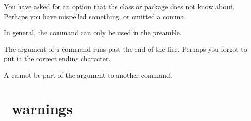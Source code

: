 \begin{plainlist}
\item[]

    You have asked for an option that the class or package does not know about.
Perhaps you have mispelled something, or omitted a comma.


\item[]

    In general, the \cmd{\usepackage} command can only be used in the 
preamble.


\item[]

     The argument of a  command runs past the end of the line.
Perhaps you forgot to put in the correct ending character.

\item[]

    A  cannot be part of the argument to another command.








 


\end{plainlist}



\section{\ltx\ warnings}

